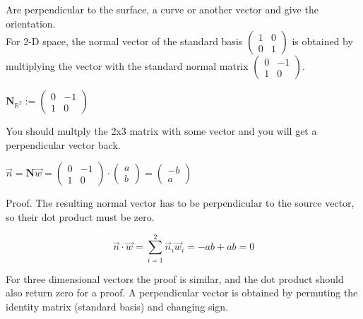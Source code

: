 \documentclass[a4paper]{article}
\begin{document}
Are perpendicular to the surface, a curve or another vector and give the orientation.\\

For 2-D space, the normal vector of the standard basis $\begin{pmatrix}1&0\\0&1\end{pmatrix}$ is obtained by multiplying the vector with the standard normal matrix $\begin{pmatrix}0 & -1 \\ 1 & 0\end{pmatrix}$.\\

\begin{center}
$\boldsymbol{N}_{\mathbb{R}^{2}} := \begin{pmatrix}0 & -1 \\ 1 & 0\end{pmatrix}$\\
\end{center}

You should multply the 2x3 matrix with some vector and you will get a perpendicular vector back.

\begin{center}
$\vec{n} = \boldsymbol{N}\vec{w} = \begin{pmatrix}0 & -1 \\ 1 & 0\end{pmatrix} \cdot \begin{pmatrix}a\\b\end{pmatrix} = \begin{pmatrix}-b\\a\end{pmatrix}$
\end{center}

Proof. The resulting normal vector has to be perpendicular to the source vector, so their dot product must be zero.

\begin{displaymath}
\vec{n} \cdot \vec{w} = \sum_{i=1}^{2}\vec{n}_{i}\vec{w}_i = -ab + ab = 0
\end{displaymath}

For three dimensional vectors the proof is similar, and the dot product should also return zero for a proof. A perpendicular vector is obtained by permuting the identity matrix (standard basis) and changing sign.
\end{document}

